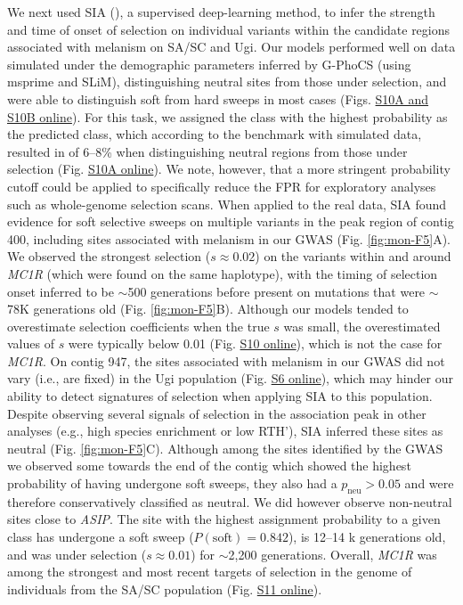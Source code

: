 We next used \ac{SIA} (\cite{hejase_deep-learning_2022}), a supervised deep-learning method, to infer the strength and time of onset of selection on individual variants within the candidate regions associated with melanism on \ac{SA/SC} and Ugi. Our models performed well on data simulated under the demographic parameters inferred by G-PhoCS (using msprime and SLiM), distinguishing neutral sites from those under selection, and were able to distinguish soft from hard sweeps in most cases (Figs. \href{https://journals.plos.org/PLOSGENETICS/article?id=10.1371/journal.pgen.1010474#sec017}{S10A and S10B online}). For this task, we assigned the class with the highest probability as the predicted class, which according to the benchmark with simulated data, resulted in  of 6–8\% when distinguishing neutral regions from those under selection (Fig. \href{https://journals.plos.org/PLOSGENETICS/article?id=10.1371/journal.pgen.1010474#sec017}{S10A online}). We note, however, that a more stringent probability cutoff could be applied to specifically reduce the \ac{FPR} for exploratory analyses such as whole-genome selection scans. When applied to the real data, \ac{SIA} found evidence for soft selective sweeps on multiple variants in the peak region of contig 400, including sites associated with melanism in our \ac{GWAS} (Fig. \ref{fig:mon-F5}A). We observed the strongest selection ($s \approx 0.02$) on the variants within and around \textit{MC1R} (which were found on the same haplotype), with the timing of selection onset inferred to be $\sim$500 generations before present on mutations that were $\sim$78K generations old (Fig. \ref{fig:mon-F5}B). Although our models tended to overestimate selection coefficients when the true $s$ was small, the overestimated values of $s$ were typically below 0.01 (Fig. \href{https://journals.plos.org/PLOSGENETICS/article?id=10.1371/journal.pgen.1010474#sec017}{S10 online}), which is not the case for \textit{MC1R}. On contig 947, the sites associated with melanism in our \ac{GWAS} did not vary (i.e., are fixed) in the Ugi population (Fig. \href{https://journals.plos.org/PLOSGENETICS/article?id=10.1371/journal.pgen.1010474#sec017}{S6 online}), which may hinder our ability to detect signatures of selection when applying \ac{SIA} to this population. Despite observing several signals of selection in the association peak in other analyses (e.g., high species enrichment or low \acs{RTH}’), \ac{SIA} inferred these sites as neutral (Fig. \ref{fig:mon-F5}C). Although among the sites identified by the \ac{GWAS} we observed some towards the end of the contig which showed the highest probability of having undergone soft sweeps, they also had a $p_{\mathrm{neu}} > 0.05$ and were therefore conservatively classified as neutral. We did however observe non-neutral sites close to \textit{ASIP}. The site with the highest assignment probability to a given class has undergone a soft sweep ($P\mathrm{(soft)} = 0.842$), is 12–14 k generations old, and was under selection ($s \approx 0.01$) for $\sim$2,200 generations. Overall, \textit{MC1R} was among the strongest and most recent targets of selection in the genome of individuals from the \ac{SA/SC} population (Fig. \href{https://journals.plos.org/PLOSGENETICS/article?id=10.1371/journal.pgen.1010474#sec017}{S11 online}).
